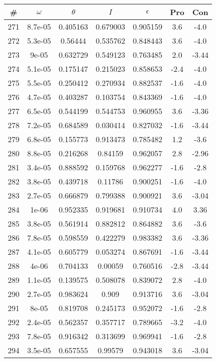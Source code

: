 \begin{table}
\begin{tabular}{c|c|c|c|c|c|c}
\# & $\omega$ & $\theta$ & $I$ & $\epsilon$ & Pro & Con\\
\hline
271 & 8.7e-05 & 0.405163 & 0.679003 & 0.905159 & 3.6 & -4.0\\
272 & 5.3e-05 & 0.56444 & 0.535762 & 0.848443 & 3.6 & -4.0\\
273 & 9e-05 & 0.632729 & 0.549123 & 0.763485 & 2.0 & -3.44\\
274 & 5.1e-05 & 0.175147 & 0.215023 & 0.858653 & -2.4 & -4.0\\
275 & 5.5e-05 & 0.250412 & 0.270934 & 0.882537 & -1.6 & -4.0\\
276 & 4.7e-05 & 0.403287 & 0.103754 & 0.843369 & -1.6 & -4.0\\
277 & 6.5e-05 & 0.544199 & 0.544753 & 0.960955 & 3.6 & -3.36\\
278 & 7.2e-05 & 0.684589 & 0.030414 & 0.827032 & -1.6 & -3.44\\
279 & 6.8e-05 & 0.155773 & 0.913473 & 0.785482 & 1.2 & -3.6\\
280 & 8.8e-05 & 0.216268 & 0.84159 & 0.962057 & 2.8 & -2.96\\
281 & 3.4e-05 & 0.888592 & 0.159768 & 0.962277 & -1.6 & -2.8\\
282 & 3.8e-05 & 0.439718 & 0.11786 & 0.900251 & -1.6 & -4.0\\
283 & 2.7e-05 & 0.666879 & 0.799388 & 0.900921 & 3.6 & -3.04\\
284 & 1e-06 & 0.952335 & 0.919681 & 0.910734 & 4.0 & 3.36\\
285 & 3.8e-05 & 0.561914 & 0.882812 & 0.864882 & 3.6 & -3.6\\
286 & 7.8e-05 & 0.598559 & 0.422279 & 0.983382 & 3.6 & -3.36\\
287 & 4.1e-05 & 0.605779 & 0.053274 & 0.867691 & -1.6 & -3.44\\
288 & 4e-06 & 0.704133 & 0.00059 & 0.760516 & -2.8 & -3.44\\
289 & 1.1e-05 & 0.139575 & 0.508078 & 0.839072 & 2.8 & -4.0\\
290 & 2.7e-05 & 0.983624 & 0.909 & 0.913716 & 3.6 & -3.04\\
291 & 8e-05 & 0.819708 & 0.245173 & 0.952072 & -1.6 & -2.8\\
292 & 2.4e-05 & 0.562357 & 0.357717 & 0.789665 & -3.2 & -4.0\\
293 & 7.8e-05 & 0.916342 & 0.313699 & 0.969941 & -1.6 & -2.8\\
294 & 3.5e-05 & 0.657555 & 0.99579 & 0.943018 & 3.6 & -3.04\\

\end{tabular}
\end{table}
